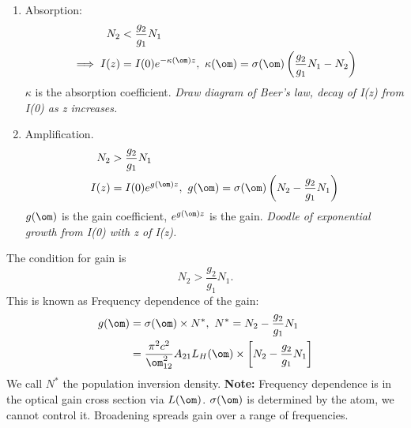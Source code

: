 \documentclass[a4paper, 11pt, normalem]{report}
\begin{document}
\begin{enumerate}
    \item Absorption:
        \begin{align}
            N_2 &< \frac{g_2}{g_1}N_1 \\
            \implies I(z) &= I(0)e^{-\kappa(\om)z},~ \kappa(\om) = \sigma(\om)\left(\frac{g_2}{g_1}N_1 - N_2\right)  
        \end{align}
        $\kappa$ is the absorption coefficient. 
        \textit{Draw diagram of Beer's law, decay of I(z) from I(0) as z increases.}
    \item Amplification.
        \begin{align}
            N_2 &> \frac{g_2}{g_1}N_1 \\
            I(z) &= I(0)e^{g(\om)z},~ g(\om) = \sigma(\om)\left(N_2-\frac{g_2}{g_1}N_1\right)
        \end{align}
        $g(\om)$ is the gain coefficient, $e^{g(\om)z}$ is the gain. 
        \textit{Doodle of exponential growth from I(0) with z of I(z).}
\end{enumerate}
The condition for gain is
\begin{equation}
    N_2 > \frac{g_2}{g_1}N_1.
\end{equation}
This is known as 
Frequency dependence of the gain:
\begin{align}
    g(\om) &= \sigma(\om)\times N^*, ~ N^* = N_2 - \frac{g_2}{g_1}N_1 \\
           &= \frac{\pi^2c^2}{\om_{12}^2}A_{21}L_H(\om)\times \left[N_2-\frac{g_2}{g_1}N_1\right]
\end{align}
We call $N^*$ the population inversion density. 
\textbf{Note:} Frequency dependence is in the optical gain cross section via $L(\om)$. 
$\sigma(\om)$ is determined by the atom, we cannot control it. 
Broadening spreads gain over a range of frequencies. 
\end{document}
